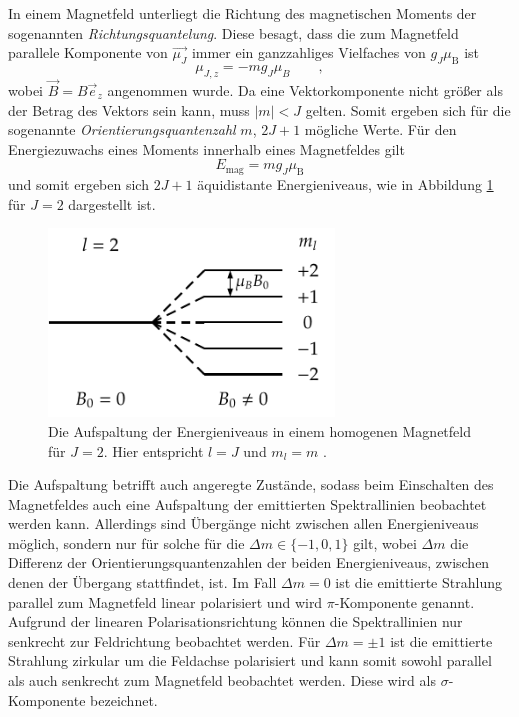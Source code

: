 In einem Magnetfeld unterliegt die Richtung des magnetischen Moments der sogenannten \textit{Richtungsquantelung}. Diese besagt, dass die zum Magnetfeld parallele Komponente von $\vec{\mu_J}$ immer ein ganzzahliges Vielfaches von $g_J\mu_{\text{B}}$ ist
\begin{equation}
\mu_{J,z}= -m g_J\mu_B \qquad ,
\end{equation}
wobei $\vec{B}=B\vec{e}_z$ angenommen wurde.
Da eine Vektorkomponente nicht größer als der Betrag des Vektors sein kann, muss $|m|< J$ gelten. Somit ergeben sich für die sogenannte \textit{Orientierungsquantenzahl} $m$, $2J+1$ mögliche Werte.
Für den Energiezuwachs eines Moments innerhalb eines Magnetfeldes gilt
\begin{equation}
E_\text{mag} = mg_J\mu_\text{B}
\end{equation}
und somit ergeben sich $2J+1$ äquidistante Energieniveaus, wie in Abbildung \ref{fig:tfig2} für $J=2$ dargestellt ist.

\begin{figure}
\centering
\includegraphics[height=5.0cm]{zeeman-effekt_2.pdf}
\caption{Die Aufspaltung der Energieniveaus in einem homogenen Magnetfeld für $J=2$. Hier entspricht $l=J$ und $m_l=m$ \cite{quelle04}.}
\label{fig:tfig2}
\end{figure}

Die Aufspaltung betrifft auch angeregte Zustände, sodass beim Einschalten des Magnetfeldes auch eine Aufspaltung der emittierten Spektrallinien beobachtet werden kann. Allerdings sind Übergänge nicht zwischen allen 
Energieniveaus möglich, sondern nur für solche für die $\Delta m \in \{-1, 0, 1\}$ gilt, wobei $\Delta m$ die Differenz der Orientierungsquantenzahlen der beiden Energieniveaus, zwischen denen der Übergang stattfindet, ist.
Im Fall $\Delta m = 0$ ist die emittierte Strahlung parallel zum Magnetfeld linear polarisiert und wird $\pi$-Komponente genannt. Aufgrund der linearen Polarisationsrichtung können die Spektrallinien nur senkrecht zur Feldrichtung
beobachtet werden. Für $\Delta m = \pm 1$ ist die emittierte Strahlung zirkular um die Feldachse polarisiert und kann somit sowohl parallel als auch senkrecht zum Magnetfeld beobachtet werden. Diese wird als $\sigma$-Komponente bezeichnet.


